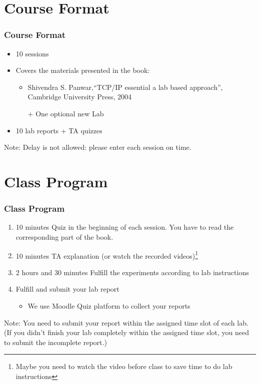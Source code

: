 \documentclass[aspectratio=169,15pt]{beamer}
\begin{document}
\section{Course Format}
\begin{frame}
    \frametitle{Course Format}

    \begin{itemize}
        \item 10 sessions
        \item Covers the materials presented in the book:
        \begin{itemize}
            \item Shivendra S. Panwar,“TCP/IP essential a lab based approach”, Cambridge University Press, 2004
            \item[+] One optional new Lab
        \end{itemize}
        \item 10 lab reports + TA quizzes
    \end{itemize}
    \begin{alertblock}{Note:}
        Delay is not allowed: please enter each session on time.
    \end{alertblock}
    
\end{frame}

\section{Class Program}
\begin{frame}
    \frametitle{Class Program}
    
    \begin{enumerate}
        \item \alert{10 minutes} Quiz in the beginning of each session. You have to read the corresponding part of the book.
        \item \alert{10 minutes} TA explanation (or watch the recorded videos)\footnote{Maybe you need to watch the video before class to save time to do lab instructions}
        \item \alert{2 hours and 30 minutes} Fulfill the experiments according to lab instructions
        \item Fulfill and submit your lab report
        \begin{itemize}
            \item We use Moodle Quiz platform to collect your reports
        \end{itemize}
    \end{enumerate}
    \begin{alertblock}{Note:}
        You need to submit your report  within the assigned time slot of each lab.
        (If you didn’t finish your lab completely within the assigned time slot, you need to submit the incomplete report.)
    \end{alertblock}

\end{frame}
\end{document}
